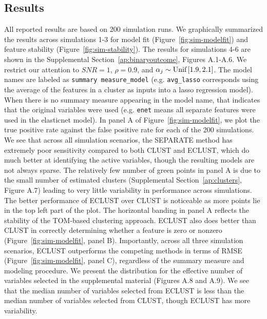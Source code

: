 \subsection{Results}
All reported results are based on 200 simulation runs. We graphically summarized the results across simulations 1-3 for model fit (Figure~\ref{fig:sim-modelfit}) and feature stability (Figure~\ref{fig:sim-stability}). The results for simulations 4-6 are shown in the Supplemental Section~\ref{ap:binaryoutcome}, Figures A.1-A.6. We restrict our attention to $SNR=1$, $\rho = 0.9$, and $\alpha_{j} \sim \textrm{{Unif}}\left[1.9, 2.1\right]$. The model names are labeled as \texttt{summary measure\_model} (e.g. \texttt{avg\_lasso} corresponds using the average of the features in a cluster as inputs into a lasso regression model). When there is no summary measure appearing in the model name, that indicates that the original variables were used (e.g. \texttt{enet} means all separate features were used in the elasticnet model). In panel A of Figure~\ref{fig:sim-modelfit}, we plot the true positive rate against the false positive rate for each of the 200 simulations. We see that across all simulation scenarios, the SEPARATE method has extremely poor sensitivity compared to both CLUST and ECLUST, which do much better at identifying the active variables, though the resulting models are not always sparse. The relatively few number of green points in panel A is due to the small number of estimated clusters (Supplemental Section~\ref{ap:clusters}, Figure A.7) leading to very little variability in performance across simulations. The better performance of ECLUST over CLUST is noticeable as more points lie in the top left part of the plot. The horizontal banding in panel A reflects the stability of the TOM-based clustering approach.
ECLUST also does better than CLUST in correctly determining whether a feature is zero or nonzero (Figure~\ref{fig:sim-modelfit}, panel B). Importantly, across all three simulation scenarios, ECLUST outperforms the competing methods in terms of RMSE (Figure~\ref{fig:sim-modelfit}, panel C), regardless of the summary measure and modeling procedure. We present the distribution for the effective number of variables selected in the supplemental material (Figures A.8 and A.9). We see that the median number of variables selected from ECLUST is less than the median number of variables selected from CLUST, though ECLUST has more variability.

\begin{comment}
\begin{figure}[H]
	\centering
	\texttt{[image: figure5.eps]}
	\caption{Model fit results from simulations 1, 2 and 3 with $SNR=1$, $\rho = 0.9$, and $\alpha_{j} \sim \tm{Unif}\left[1.9, 2.1\right]$. SEPARATE results are in pink, CLUST in green and ECLUST in blue.}
	\label{fig:sim-modelfit}
\end{figure}
\end{comment}


